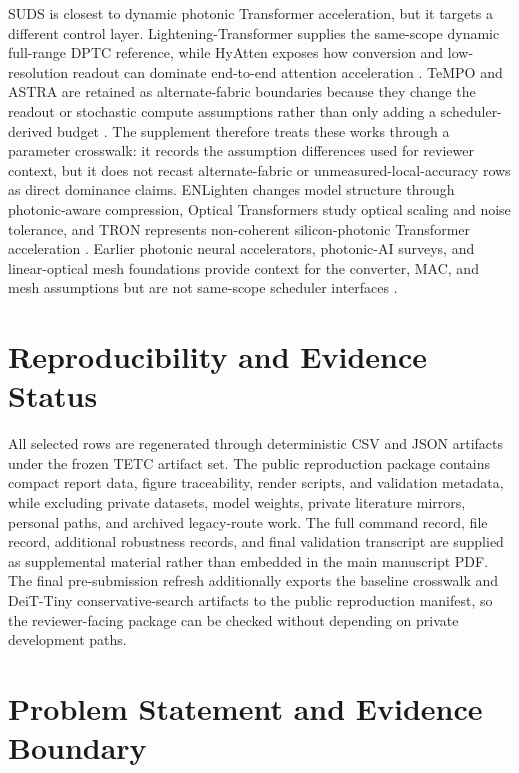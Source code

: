 \documentclass[10pt,journal]{IEEEtran}
\begin{document}
SUDS is closest to dynamic photonic Transformer acceleration, but it targets a
different control layer. Lightening-Transformer supplies the same-scope dynamic
full-range DPTC reference, while HyAtten exposes how conversion and
low-resolution readout can dominate end-to-end attention acceleration
\cite{lightening2024,hyatten2025}. TeMPO and ASTRA are retained as
alternate-fabric boundaries because they change the readout or stochastic
compute assumptions rather than only adding a scheduler-derived budget
\cite{tempo2024,astra2025}. The supplement therefore treats these works through
a parameter crosswalk: it records the assumption differences used for reviewer
context, but it does not recast alternate-fabric or unmeasured-local-accuracy
rows as direct dominance claims. ENLighten changes model structure through
photonic-aware compression, Optical Transformers study optical scaling and
noise tolerance, and TRON represents non-coherent silicon-photonic Transformer
acceleration \cite{enlighten2025,opticaltransformers2023,tron2023}. Earlier
photonic neural accelerators, photonic-AI surveys, and linear-optical mesh
foundations provide context for the converter, MAC, and mesh assumptions but are
not same-scope scheduler interfaces
\cite{heana2024,crosslight2021,sonic2021,holylight2019,shastri2021photonics,nahmias2020photonics,clements2016mesh,reck1994unitary}.

\section{Reproducibility and Evidence Status}

All selected rows are regenerated through deterministic CSV and JSON artifacts
under the frozen TETC artifact set. The public reproduction package contains
compact report data, figure traceability, render scripts, and validation
metadata, while excluding private datasets, model weights, private literature
mirrors, personal paths, and archived legacy-route work. The full command
record, file record, additional robustness records, and final validation
transcript are supplied as supplemental material rather than embedded in the main manuscript PDF.
The final pre-submission refresh additionally exports the
baseline crosswalk and DeiT-Tiny conservative-search artifacts to the public
reproduction manifest, so the reviewer-facing package can be checked without
depending on private development paths.

\section{Problem Statement and Evidence Boundary}
\end{document}
